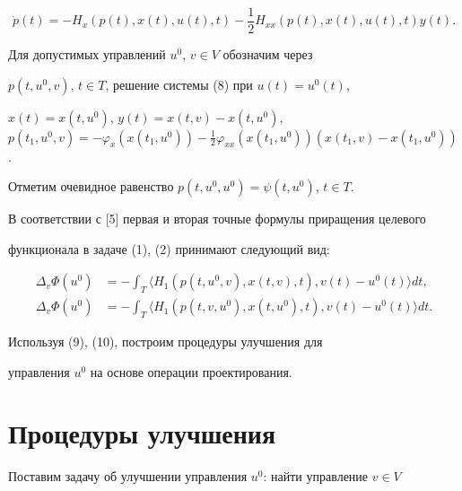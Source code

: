 \begin{equation}


\Dot{p}(t)=-H_{x}(p(t),x(t),u(t),t)-\frac{1}{2}H_{xx}(p(t),x(t),u(t),t)y(t).


\end{equation}


Для допустимых управлений $u^0$, $v\in{V}$ обозначим через


$p(t,u^0,v)$, $t\in{T}$, решение системы (8) при $u(t)=u^0(t)$,


$x(t)=x(t,u^0)$, $y(t)=x(t,v)-x(t,u^0)$, $p(t_1,u^0,v)=-\varphi_{x}(x(t_1,u^0))-


\frac{1}{2}\varphi_{xx}(x(t_1,u^0))(x(t_1,v)-x(t_1,u^0))$.


Отметим очевидное равенство $p(t,u^0,u^0)=\psi(t,u^0)$, $t\in{T}$.





В соответствии с [5] первая и вторая точные формулы приращения целевого


функционала в задаче (1), (2) принимают следующий вид:


\begin{align}


\Delta_{v}\Phi(u^0)&=-\int_{T}\langle{H_1}(p(t,u^0,v),x(t,v),t),


v(t)-u^0(t)\rangle{dt},\\


%


\Delta_{v}\Phi(u^0)&=-\int_{T}\langle{H_1}(p(t,v,u^0),x(t,u^0),t),


v(t)-u^0(t)\rangle{dt}.


\end{align}





Используя (9), (10), построим процедуры улучшения для


управления $u^0$ на основе операции проектирования.








\section{Процедуры улучшения}





Поставим задачу об улучшении управления $u^0$: найти управление $v\in{V}$


